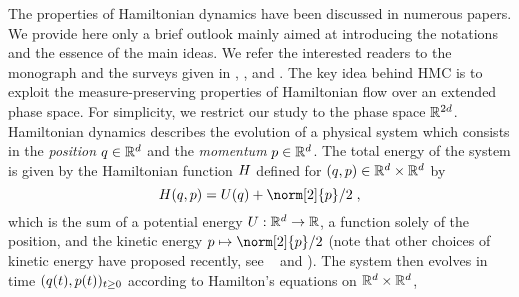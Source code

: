 The properties of Hamiltonian dynamics have been discussed in numerous
papers. We provide here only a brief outlook mainly aimed at
introducing the notations and the essence of the main ideas. We refer
the interested readers to the monograph \cite{leimkuhler:reich:2004}
and the surveys given in \cite[Chapter~9]{liu:2008}, \cite{neal:2011},
\cite{betancourt-bernoulli:2017} and
\cite{bou-rabee:sanz-serna:2018}. The key idea behind HMC is to
exploit the measure-preserving properties of Hamiltonian flow over an
extended phase space. For simplicity, we restrict our study to the
phase space $\mathbb{R}^{2d}$. Hamiltonian dynamics describes the evolution
of a physical system which consists in the \emph{position}
$q \in \mathbb{R}^d$ and the \emph{momentum} $p \in \mathbb{R}^d$.
The total energy of the system is given by the Hamiltonian function $H$ defined for  $(q,p) \in \mathbb{R}^d \times \mathbb{R}^d$ by
\begin{equation}
  \label{eq:def_ham}
\Ham(\q,\p) = \F(\q) + \norm[2]{\p}/2 \eqsp,
\end{equation}
which is the sum of a potential energy $U : \mathbb{R}^d \to \mathbb{R}$, a
function solely of the position, and the kinetic energy
$p \mapsto \norm[2]{p}/2$ (note that other choices of kinetic energy
have proposed recently, see \eg~\cite{livingstone:faulkner:roberts:2017} and \cite{lu:et:al:2016}).
The system then evolves in time $(q(t),p(t))_{t \geq 0}$ according to Hamilton's equations on $\mathbb{R}^d \times \mathbb{R}^d$,
